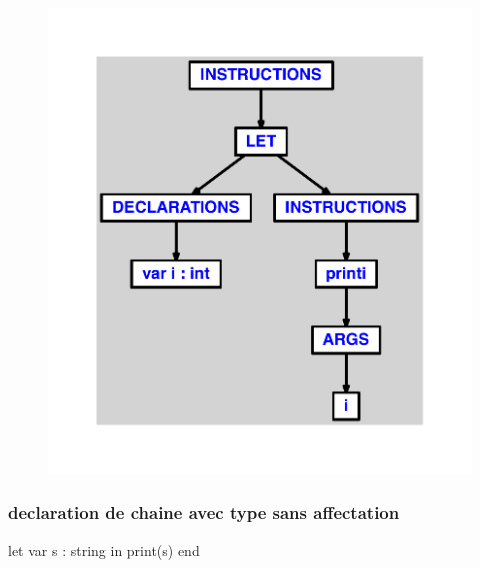 \documentclass{article}
\begin{document}
\begin{figure}[H]\centering\includegraphics[max width=\textwidth]{ast/ast_280.pdf}\end{figure}\subsubsection{declaration de chaine avec type sans affectation}
\begin{verbatimtab}
let
	var s : string
in
	print(s)
end
\end{verbatimtab}
\end{document}
